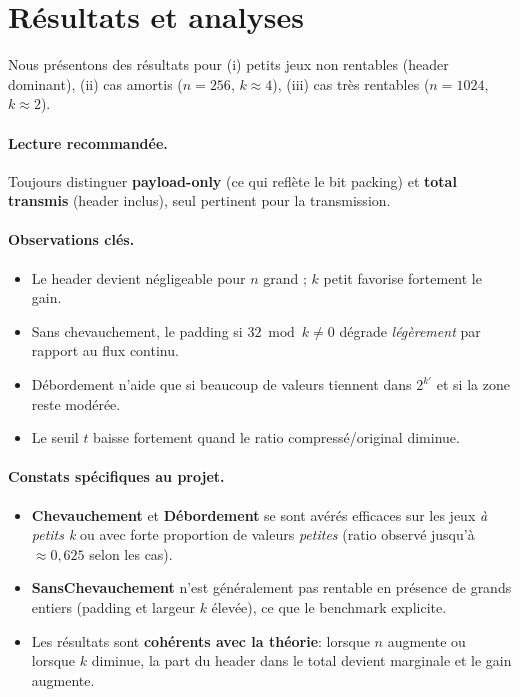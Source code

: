 \section{Résultats et analyses}
\label{sec:resultats}

Nous présentons des résultats pour (i) petits jeux non rentables (header dominant), (ii) cas amortis (\(n=256\), \(k\approx 4\)), (iii) cas très rentables (\(n=1024\), \(k\approx 2\)).

\paragraph{Lecture recommandée.} Toujours distinguer \textbf{payload-only} (ce qui reflète le bit packing) et \textbf{total transmis} (header inclus), seul pertinent pour la transmission.

\paragraph{Observations clés.}
\begin{itemize}
  \item Le header devient négligeable pour $n$ grand ; $k$ petit favorise fortement le gain.
  \item Sans chevauchement, le padding si $32\bmod k\neq 0$ dégrade \emph{légèrement} par rapport au flux continu.
  \item Débordement n'aide que si beaucoup de valeurs tiennent dans $2^{k'}$ et si la zone reste modérée.
  \item Le seuil $t$ baisse fortement quand le ratio compressé/original diminue.
\end{itemize}
\paragraph{Constats spécifiques au projet.}
\begin{itemize}
  \item \textbf{Chevauchement} et \textbf{Débordement} se sont avérés efficaces sur les jeux \emph{à petits k} ou avec forte proportion de valeurs \emph{petites} (ratio observé jusqu'à $\approx 0{,}625$ selon les cas).
  \item \textbf{SansChevauchement} n'est généralement pas rentable en présence de grands entiers (padding et largeur $k$ élevée), ce que le benchmark explicite.
  \item Les résultats sont \textbf{cohérents avec la théorie}: lorsque $n$ augmente ou lorsque $k$ diminue, la part du header dans le total devient marginale et le gain augmente.
\end{itemize}
